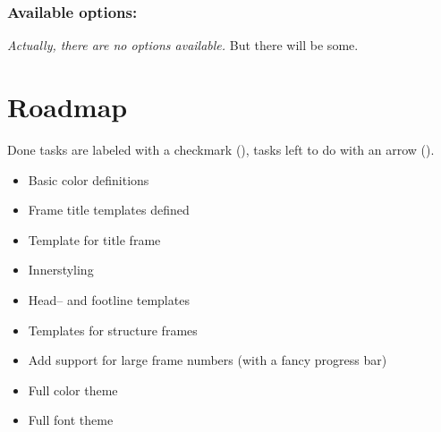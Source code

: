 \documentclass[11pt]{ltxdoc}
\newcommand{\cmark}{\ding{51}}
\newcommand{\darrow}{\ding{212}}
\begin{document}
	\subsubsection*{Available options:}
	\textit{Actually, there are no options available.} But there will be some.
	
	
	
	
	
	\section{Roadmap}
	Done tasks are labeled with a checkmark (\cmark), tasks left to do with an arrow (\darrow).
	\begin{itemize}
		\item[\cmark]  Basic color definitions
		\item[\cmark]  Frame title templates defined
		\item[\darrow] Template for title frame
		\item[\darrow] Innerstyling
		\item[\darrow] Head-- and footline templates
		\item[\darrow] Templates for structure frames
		\item[\darrow] Add support for large frame numbers (with a fancy progress bar)
		\item[\darrow] Full color theme
		\item[\darrow] Full font theme
	\end{itemize}
	
	

	
	
	\vfill
	\thispagestyle{empty}
	\listoffigures
\end{document}
